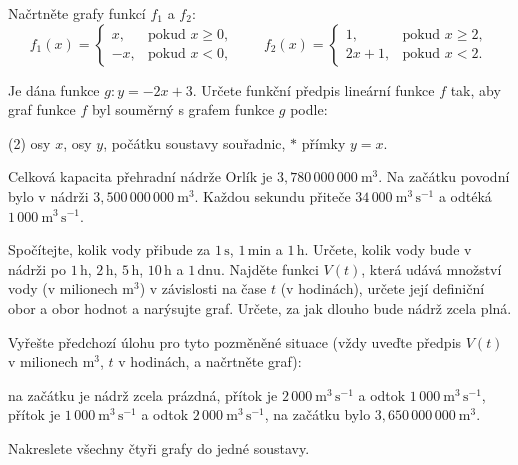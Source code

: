 \documentclass[12pt,a4paper]{article}
\begin{document}
\begin{exercise}
    Načrtněte grafy funkcí $f_1$ a $f_2$:
    \[
    f_1(x)=
    \begin{cases}
        x, & \text{pokud } x\ge 0,\\
        -x, & \text{pokud } x<0,
    \end{cases}
    \qquad
    f_2(x)=
    \begin{cases}
        1, & \text{pokud } x\ge 2,\\
        2x+1, & \text{pokud } x<2.
    \end{cases}
    \]
\end{exercise}


\begin{exercise}
    Je dána funkce $g\colon y=-2x+3$.  
    Určete funkční předpis lineární funkce $f$ tak, aby graf funkce $f$ byl souměrný s grafem funkce $g$ podle:
    \begin{tasks}(2)
        \task osy $x$,
        \task osy $y$,
        \task počátku soustavy souřadnic,
        \task $* $ přímky $y=x$.
    \end{tasks}
\end{exercise}


\newpage
\setcounter{section}{2}
\begin{exercise}
Celková kapacita přehradní nádrže Orlík je \(3{,}780\,000\,000~\mathrm{m^3}\). Na začátku povodní bylo v nádrži \(3{,}500\,000\,000~\mathrm{m^3}\). Každou sekundu přiteče \(34\,000~\mathrm{m^3\,s^{-1}}\) a odtéká \(1\,000~\mathrm{m^3\,s^{-1}}\).
\begin{tasks}
\task Spočítejte, kolik vody přibude za \(1\,\mathrm{s}\), \(1\,\mathrm{min}\) a \(1\,\mathrm{h}\).
\task Určete, kolik vody bude v nádrži po \(1\,\mathrm{h}\), \(2\,\mathrm{h}\), \(5\,\mathrm{h}\), \(10\,\mathrm{h}\) a \(1\,\mathrm{dnu}\).
\task Najděte funkci \(V(t)\), která udává množství vody (v milionech \(\mathrm{m^3}\)) v závislosti na čase \(t\) (v hodinách), určete její definiční obor a obor hodnot a narýsujte graf.
\task Určete, za jak dlouho bude nádrž zcela plná.
\end{tasks}
\end{exercise}

\begin{exercise}
Vyřešte předchozí úlohu pro tyto pozměněné situace (vždy uveďte předpis \(V(t)\) v milionech \(\mathrm{m^3}\), \(t\) v hodinách, a načrtněte graf):
\begin{tasks}
\task na začátku je nádrž zcela prázdná,
\task přítok je \(2\,000~\mathrm{m^3\,s^{-1}}\) a odtok \(1\,000~\mathrm{m^3\,s^{-1}}\),
\task přítok je \(1\,000~\mathrm{m^3\,s^{-1}}\) a odtok \(2\,000~\mathrm{m^3\,s^{-1}}\),
\task na začátku bylo \(3{,}650\,000\,000~\mathrm{m^3}\).
\end{tasks}
Nakreslete všechny čtyři grafy do jedné soustavy.
\end{exercise}
\end{document}
